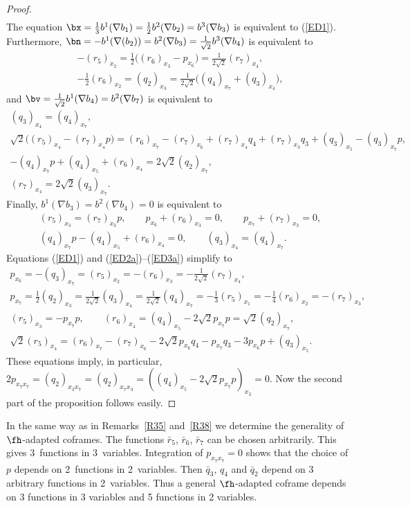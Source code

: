 \begin{proof}
\begin{gather*}
\end{gather*}
The equation $\bx=\frac13 b^1(\nabla b_1)=\frac12 b^2(\nabla b_2)=b^3(\nabla b_3)$ is equivalent to (\ref{ED1}). Furthermore,
$\bn=-b^1(\nabla(b_2))=b^2(\nabla b_3)=\frac1{\sqrt 2} b^3(\nabla b_4)$ is equivalent to
\begin{gather}
 -(r_5)_{x_2} =\tfrac12 \big((r_6)_{x_3}-p_{x_6}\big)=\tfrac1{2\sqrt 2} (r_7)_{x_4},\label{ED2a}\\
- \tfrac12 (r_6)_{x_2} =(q_2)_{x_3} =\tfrac1{2\sqrt 2}\big((q_4)_{x_7}+(q_3)_{x_4}\big),
\end{gather}
and $\bv=\frac1{\sqrt2} b^1(\nabla b_4)=b^2(\nabla b_7)$ is equivalent to
\begin{gather}
(q_3)_{x_4}=(q_4)_{x_7},\\
\sqrt2\big((r_5)_{x_4}-(r_7)_{x_4}p\big)=(r_6)_{x_7} -(r_7)_{x_6}+(r_7)_{x_4}q_4+(r_7)_{x_3}q_3+(q_3)_{x_5}-(q_3)_{x_7}p,\\
-(q_4)_{x_7}p+(q_4)_{x_5}+(r_6)_{x_4} = 2\sqrt2 (q_2)_{x_7}, \\
(r_7)_{x_4} = 2\sqrt2 (q_3)_{x_7}.
\end{gather}
Finally, $ b^1(\nabla b_3) =b^2(\nabla b_4 )=0$ is equivalent to
\begin{gather}
(r_5)_{x_3}=(r_7)_{x_3 }p,\qquad p_{x_6}+(r_6)_{x_3}=0,\qquad p_{x_7}+(r_7)_{x_3}=0, \\
(q_4)_{x_7}p-(q_4)_{x_5}+(r_6)_{x_4}=0, \qquad (q_3)_{x_4}=(q_4)_{x_7} . \label{ED3a}
 \end{gather}
Equations (\ref{ED1}) and (\ref{ED2a})--(\ref{ED3a}) simplify to
\begin{gather*}
p_{x_6}=-(q_3)_{x_7}=(r_5)_{x_2}=-(r_6)_{x_3}=- \tfrac1{2\sqrt2} (r_7)_{x_4},\\
p_{x_7}= \tfrac 12 (q_2)_{x_3}=\tfrac1{2\sqrt2}(q_3)_{x_4}=\tfrac1{2\sqrt2}(q_4)_{x_7}=-\tfrac13(r_5)_{x_1}=-\tfrac14(r_6)_{x_2}=-(r_7)_{x_3},\\
(r_5)_{x_3}=- p_{x_7}p,\qquad
(r_6)_{x_4}=(q_4)_{x_5}-2\sqrt2 p_{x_7}p=\sqrt2 (q_2)_{x_7},\\
\sqrt2 (r_5)_{x_4}=(r_6)_{x_7}-(r_7)_{x_6}-2\sqrt2 p_{x_6}q_4-p_{x_7}q_3-3p_{x_6}p+(q_3)_{x_5}.
\end{gather*}
These equations imply, in particular, $2p_{x_7 x_7}=(q_2)_{x_3 x_7}=(q_2)_{x_7 x_3}=((q_4)_{x_5}-2\sqrt2 p_{x_7}p)_{x_3}=0$. Now the second part of the proposition follows easily.
\end{proof}
\begin{Remark} In the same way as in Remarks~\ref{R35} and~\ref{R38} we determine the generality of $\fh$-adapted coframes. The functions $ \bar r_5$, $\bar r_6$, $\bar r_7$ can be chosen arbitrarily. This gives 3~functions in 3~variables. Integration of $p_{x_7 x_7}=0$ shows that the choice of $p$ depends on 2~functions in 2~variables. Then $\bar q_3$, $q_4$ and $\bar q_2$ depend on 3 arbitrary functions in 2~variables. Thus a general $\fh$-adapted coframe depends on 3 functions in 3 variables and 5 functions in 2 variables.
\end{Remark}

